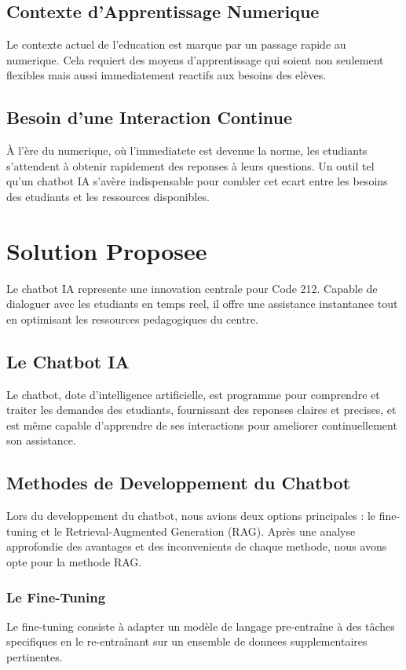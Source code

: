 \documentclass[a4paper, 11pt, openany]{report}
\begin{document}
\subsection{Contexte d'Apprentissage Numerique}
Le contexte actuel de l'education est marque par un passage rapide au numerique. Cela requiert des moyens d'apprentissage qui soient non seulement flexibles mais aussi immediatement reactifs aux besoins des elèves.

\subsection{Besoin d'une Interaction Continue}
À l'ère du numerique, où l'immediatete est devenue la norme, les etudiants s'attendent à obtenir rapidement des reponses à leurs questions. Un outil tel qu'un chatbot IA s'avère indispensable pour combler cet ecart entre les besoins des etudiants et les ressources disponibles.

\section{Solution Proposee}
Le chatbot IA represente une innovation centrale pour Code 212. Capable de dialoguer avec les etudiants en temps reel, il offre une assistance instantanee tout en optimisant les ressources pedagogiques du centre.

\subsection{Le Chatbot IA}
Le chatbot, dote d'intelligence artificielle, est programme pour comprendre et traiter les demandes des etudiants, fournissant des reponses claires et precises, et est même capable d'apprendre de ses interactions pour ameliorer continuellement son assistance.

\subsection{Methodes de Developpement du Chatbot}
Lors du developpement du chatbot, nous avions deux options principales : le fine-tuning et le Retrieval-Augmented Generation (RAG). Après une analyse approfondie des avantages et des inconvenients de chaque methode, nous avons opte pour la methode RAG.

\subsubsection{Le Fine-Tuning}
Le fine-tuning consiste à adapter un modèle de langage pre-entraîne à des tâches specifiques en le re-entraînant sur un ensemble de donnees supplementaires pertinentes.
\end{document}
